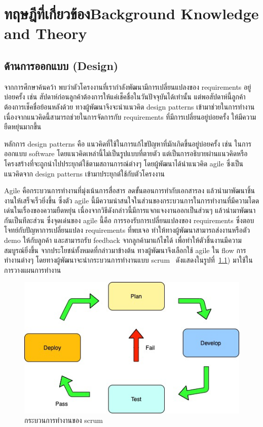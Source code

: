 \chapter{\ifcpe ทฤษฎีที่เกี่ยวข้อง\else Background Knowledge and Theory\fi}

\section{ด้านการออกแบบ (Design)}
จากการศึกษาค้นคว้า พบว่าตัวโครงงานที่เรากำลังพัฒนามีการเปลี่ยนแปลงของ requirements อยู่บ่อยครั้ง เช่น สัปดาห์ก่อนลูกค้าต้องการให้แค่เช็คชื่อในวันปัจจุบันได้เท่านั้น  แต่พอสัปดาห์นี้ลูกค้าต้องการเช็คชื่อย้อนหลังด้วย
ทางผู้พัฒนาจึงจะนำแนวคิด design patterns \cite{designPatterns} เข้ามาช่วยในการทำงาน เนื่องจากแนวคิดนี้สามารถช่วยในการจัดการกับ requirements ที่มีการเปลี่ยนอยู่บ่อยครั้ง ให้มีความยืดหยุ่นมากขึ้น


หลักการ design patterns คือ แนวคิดที่ใช้ในการแก้ไขปัญหาที่มักเกิดขึ้นอยู่บ่อยครั้ง เช่น ในการออกแบบ software โดยแนวคิดเหล่านี้ไม่เป็นรูปแบบที่ตายตัว แต่เป็นการอธิบายผ่านแนวคิดหรือโครงสร้างที่จะถูกนำไปประยุกต์ใช้ตามสถานการณ์ต่างๆ  
โดยผู้พัฒนาได้นำแนวคิด agile \cite{agile}  ซึ่งเป็นแนวคิดจาก design patterns เข้ามาประยุกต์ใช้กับตัวโครงงาน 


Agile คือกระบวนการทำงานที่มุ่งเน้นการสื่อสาร ลดขั้นตอนการทำกับเอกสารลง แล้วนำมาพัฒนาชิ้นงานให้เสร็จเร็วยิ่งขึ้น  ซึ่งตัว agile นี้มีความน่าสนใจในส่วนของกระบวนการในการทำงานที่มีความโดดเด่นในเรื่องของความยืดหยุ่น  เนื่องจากวิธีดังกล่าวนี้มีการแจกแจงงานออกเป็นส่วนๆ  แล้วนำมาพัฒนากันเป็นทีละส่วน  
ซึ่งจุดเด่นของ agile นี้คือ การรองรับการเปลี่ยนแปลงของ requirements ซึ่งตอบโจทย์กับปัญหาการเปลี่ยนแปลง requirements ที่พบเจอ ทำให้ทางผู้พัฒนาสามารถส่งงานหรือตัว demo ให้กับลูกค้า และสามารถรับ feedback จากลูกค้ามาแก้ไขได้ เพื่อทำให้ตัวชิ้นงานมีความสมบูรณ์ยิ่งขึ้น 
 จากประโยชน์ทั้งหมดที่กล่าวมาข้างต้น ทางผู้พัฒนาจึงเลือกใช้ agile ใน flow การทำงานต่างๆ โดยทางผู้พัฒนาจะนำกระบวนการทำงานแบบ scrum~\cite{srcum} ดังแสดงในรูปที่~\ref{fig:Scrum}) มาใช้ในการวางแผนการทำงาน 
%
\begin{figure}
  \begin{center}
    \includegraphics[width=\linewidth]{images/scrum.jpeg}
  \end{center}
  \caption[กระบวนการทำงานของ scrum]{กระบวนการทำงานของ scrum}
  \label{fig:Scrum}
\end{figure}





